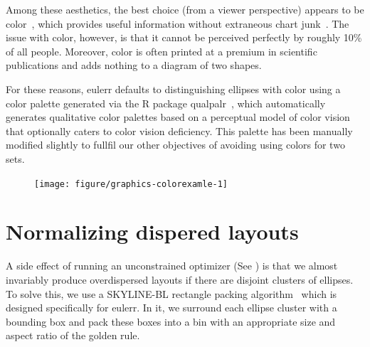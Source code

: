 \documentclass[
  oneside,
  usegeometry,
  numbers=noendperiod,
  openany,
  parskip=half
]{scrbook}\usepackage[]{graphicx}\usepackage{xcolor}
\newenvironment{knitrout}{}{} %
\newcommand{\pkg}[1]{{\fontseries{b}\selectfont #1}}
\begin{document}
\begin{appendices}
Among these aesthetics, the best choice (from a viewer perspective) appears to be color~\citep{blake_2016}, which provides useful information without extraneous chart junk~\citep{tufte_2001}. The issue with color, however, is that it cannot be perceived perfectly by roughly 10\% of all people. Moreover, color is often printed at a premium in scientific publications and adds nothing to a diagram of two shapes.

For these reasons, \pkg{eulerr} defaults to distinguishing ellipses with color using a color palette generated via the R package \pkg{qualpalr}~\citep{larsson_2016}, which automatically generates qualitative color palettes based on a perceptual model of color vision that optionally caters to color vision deficiency. This palette has been manually modified slightly to fullfil our other objectives of avoiding using colors for two sets.

\begin{figure}
\begin{knitrout}
\color{fgcolor}

{\centering \texttt{[image: figure/graphics-colorexamle-1]} 

}



\end{knitrout}
\label{fig:colorexample}
\end{figure}

\section{Normalizing dispered layouts}
\label{sec:layout}

A side effect of running an unconstrained optimizer (See ) is that we almost invariably produce overdispersed layouts if there are disjoint clusters of ellipses. To solve this, we use a SKYLINE-BL rectangle packing algorithm~\citep{jylanki_2010} which is designed specifically for \pkg{eulerr}. In it, we surround each ellipse cluster with a bounding box and pack these boxes into a bin with an appropriate size and aspect ratio of the golden rule.

\end{appendices}

\backmatter



\end{document}
